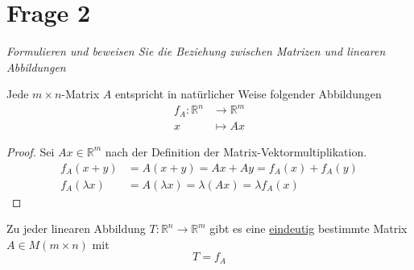 \section{Frage 2}
\textit{Formulieren und beweisen Sie die Beziehung zwischen Matrizen und linearen Abbildungen}
\begin{theorem}
    Jede $m\times n$-Matrix $A$ entspricht in natürlicher Weise folgender Abbildungen
    \begin{align*}
        f_A : \mathbb{R}^n&\to \mathbb{R}^m\\
        x &\mapsto Ax
    \end{align*}
\end{theorem}
\begin{proof}
    Sei $Ax\in\mathbb{R}^m$ nach der Definition der Matrix-Vektormultiplikation.
    \begin{align*}
        f_A(x+y) &= A(x+y) = Ax + Ay = f_A(x) + f_A(y)\\
        f_A(\lambda x) &= A(\lambda x) = \lambda(Ax) = \lambda f_A(x)
    \end{align*}
\end{proof}
\begin{theorem}
    Zu jeder linearen Abbildung $T:\mathbb{R}^n\to \mathbb{R}^m$ gibt es eine \underline{eindeutig} 
    bestimmte Matrix $A\in M(m\times n)$ mit
    \[
        T=f_A
    \]
\end{theorem}

